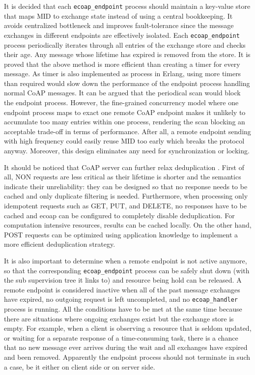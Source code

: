 It is decided that each \verb|ecoap_endpoint| process should maintain a key-value store that maps MID to exchange state instead of using a central bookkeeping. It avoids centralized bottleneck and improves fault-tolerance since the message exchanges in different endpoints are effectively isolated. Each \verb|ecoap_endpoint| process periodically iterates through all entries of the exchange store and checks their age. Any message whose lifetime has expired is removed from the store. It is proved that the above method is more efficient than creating a timer for every message. As timer is also implemented as process in Erlang, using more timers than required would slow down the performance of the endpoint process handling normal CoAP messages. It can be argued that the periodical scan would block the endpoint process. However, the fine-grained concurrency model where one endpoint process maps to exact one remote CoAP endpoint makes it unlikely to accumulate too many entries within one process, rendering the scan blocking an acceptable trade-off in terms of performance. After all, a remote endpoint sending with high frequency could easily reuse MID too early which breaks the protocol anyway. Moreover, this design eliminates any need for synchronization or locking.

It should be noticed that CoAP server can further relax deduplication \autocite{coap_protocol}. First of all, NON requests are less critical as their lifetime is shorter and the semantics indicate their unreliability: they can be designed so that no response needs to be cached and only duplicate filtering is needed. Furthermore, when processing only idempotent requests such as GET, PUT, and DELETE, no responses have to be cached and ecoap can be configured to completely disable deduplication. For computation intensive resources, results can be cached locally. On the other hand, POST requests can be optimized using application knowledge to implement a more efficient deduplication strategy. 

It is also important to determine when a remote endpoint is not active anymore, so that the corresponding \verb|ecoap_endpoint| process can be safely shut down (with the sub supervision tree it links to) and resource being hold can be released. A remote endpoint is considered inactive when all of the past message exchanges have expired, no outgoing request is left uncompleted, and no \verb|ecoap_handler| process is running. All the conditions have to be met at the same time because there are situations where ongoing exchanges exist but the exchange store is empty. For example, when a client is observing a resource that is seldom updated, or waiting for a separate response of a time-consuming task, there is a chance that no new message ever arrives during the wait and all exchanges have expired and been removed. Apparently the endpoint process should not terminate in such a case, be it either on client side or on server side. 

